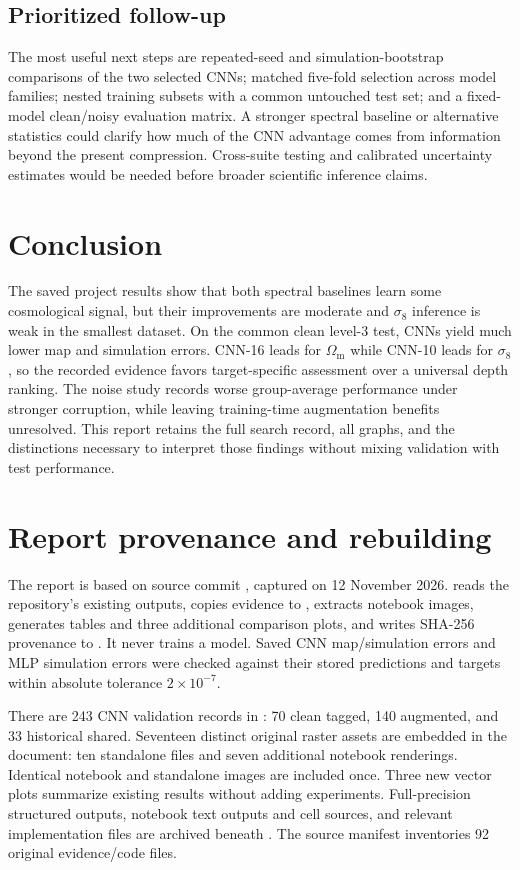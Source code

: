 \documentclass[11pt,a4paper]{article}
\newcommand{\Om}{\Omega_{\mathrm m}}
\newcommand{\sig}{\sigma_8}
\begin{document}
\subsection{Prioritized follow-up}
The most useful next steps are repeated-seed and simulation-bootstrap comparisons of the two selected CNNs; matched five-fold selection across model families; nested training subsets with a common untouched test set; and a fixed-model clean/noisy evaluation matrix. A stronger spectral baseline or alternative statistics could clarify how much of the CNN advantage comes from information beyond the present compression. Cross-suite testing and calibrated uncertainty estimates would be needed before broader scientific inference claims.

\section{Conclusion}
The saved project results show that both spectral baselines learn some cosmological signal, but their improvements are moderate and $\sig$ inference is weak in the smallest dataset. On the common clean level-3 test, CNNs yield much lower map and simulation errors. CNN-16 leads for $\Om$ while CNN-10 leads for $\sig$, so the recorded evidence favors target-specific assessment over a universal depth ranking. The noise study records worse group-average performance under stronger corruption, while leaving training-time augmentation benefits unresolved. This report retains the full search record, all graphs, and the distinctions necessary to interpret those findings without mixing validation with test performance.

\section{Report provenance and rebuilding}
\label{sec:reproduce}
The report is based on source commit \texttt{\sourcecommit}, captured on 12 November 2026.  reads the repository's existing outputs, copies evidence to , extracts notebook images, generates tables and three additional comparison plots, and writes SHA-256 provenance to . It never trains a model. Saved CNN map/simulation errors and MLP simulation errors were checked against their stored predictions and targets within absolute tolerance $2\times10^{-7}$.

There are 243 CNN validation records in : 70 clean tagged, 140 augmented, and 33 historical shared. Seventeen distinct original raster assets are embedded in the document: ten standalone files and seven additional notebook renderings. Identical notebook and standalone images are included once. Three new vector plots summarize existing results without adding experiments. Full-precision structured outputs, notebook text outputs and cell sources, and relevant implementation files are archived beneath . The source manifest inventories 92 original evidence/code files.
\end{document}
